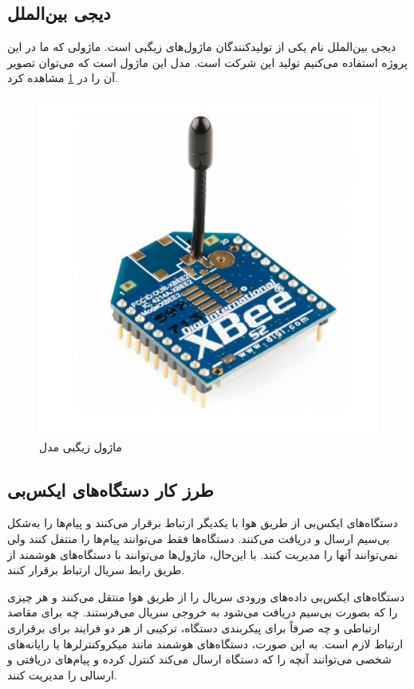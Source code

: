 \subsection{دیجی بین‌الملل}

دیجی بین‌الملل نام یکی از تولیدکنندگان ماژول‌های زیگبی است. ماژولی که ما در این پروژه استفاده می‌کنیم تولید این شرکت است. مدل این ماژول  است که ‌می‌توان تصویر آن را در \cref{fig:XBee_module} مشاهده کرد.

\begin{figure}[!h]
\centering\includegraphics[scale=.25]{XBee_module.png}
\caption{ماژول زیگبی مدل }\label{fig:XBee_module}
\end{figure}

\subsection{طرز کار دستگاه‌های ایکس‌بی}

دستگاه‌های ایکس‌بی از طریق هوا با یکدیگر ارتباط برقرار می‌کنند و پیام‌ها را به‌شکل بی‌سیم ارسال و دریافت می‌کنند. دستگاه‌ها فقط می‌توانند پیام‌ها را منتفل کنند ولی نمی‌توانند آنها را مدیریت کنند. با این‌حال، ماژول‌ها می‌توانند با دستگاه‌های هوشمند از طریق رابط سریال ارتباط برقرار کنند.


دستگاه‌های ایکس‌بی داده‌های ورودی سریال را از طریق هوا منتقل می‌کنند و هر چیزی را که بصورت بی‌سیم دریافت می‌شود به خروجی سریال می‌فرستند. چه برای مقاصد ارتباطی و چه صرفاً برای پیکربندی دستگاه، ترکیبی از هر دو فرایند برای برقراری ارتباط لازم است. به این صورت، دستگاه‌های هوشمند مانند میکروکنترلرها یا رایانه‌های شخصی می‌توانند آنچه را که دستگاه ارسال می‌کند کنترل کرده و پیام‌های دریافتی و ارسالی را مدیریت کنند\cite{Digi}.

